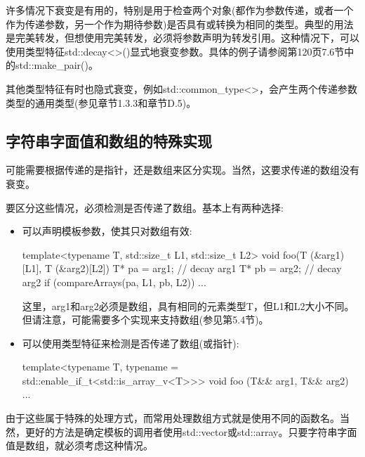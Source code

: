 许多情况下衰变是有用的，特别是用于检查两个对象(都作为参数传递，或者一个作为传递参数，另一个作为期待参数)是否具有或转换为相同的类型。典型的用法是完美转发，但想使用完美转发，必须将参数声明为转发引用。这种情况下，可以使用类型特征std::decay<>()显式地衰变参数。具体的例子请参阅第120页7.6节中的std::make\_pair()。

其他类型特征有时也隐式衰变，例如std::common\_type<>，会产生两个传递参数类型的通用类型(参见章节1.3.3和章节D.5)。

\subsection{字符串字面值和数组的特殊实现}

可能需要根据传递的是指针，还是数组来区分实现。当然，这要求传递的数组没有衰变。

要区分这些情况，必须检测是否传递了数组。基本上有两种选择:

\begin{itemize}
\item 
可以声明模板参数，使其只对数组有效:

\begin{cpp}
template<typename T, std::size_t L1, std::size_t L2>
void foo(T (&arg1)[L1], T (&arg2)[L2])
{
	T* pa = arg1; // decay arg1
	T* pb = arg2; // decay arg2
	if (compareArrays(pa, L1, pb, L2)) {
		...
	}
}
\end{cpp}

这里，arg1和arg2必须是数组，具有相同的元素类型T，但L1和L2大小不同。但请注意，可能需要多个实现来支持数组(参见第5.4节)。

\item 
可以使用类型特征来检测是否传递了数组(或指针):

\begin{cpp}
template<typename T,
		 typename = std::enable_if_t<std::is_array_v<T>>>
void foo (T&& arg1, T&& arg2)
{
	...
}
\end{cpp}
\end{itemize}

由于这些属于特殊的处理方式，而常用处理数组方式就是使用不同的函数名。当然，更好的方法是确定模板的调用者使用std::vector或std::array。只要字符串字面值是数组，就必须考虑这种情况。


















